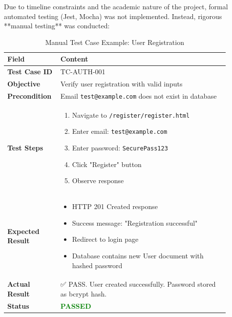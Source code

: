 Due to timeline constraints and the academic nature of the project, formal automated testing (Jest, Mocha) was not implemented. Instead, rigorous **manual testing** was conducted:

\begin{table}[H]
\centering
\caption{Manual Test Case Example: User Registration}
\label{tab:test_register}
\small
\begin{tabular}{@{}p{0.18\linewidth}p{0.72\linewidth}@{}}
\toprule
\textbf{Field} & \textbf{Content} \\
\midrule
\textbf{Test Case ID} & TC-AUTH-001 \\
\textbf{Objective} & Verify user registration with valid inputs \\
\textbf{Precondition} & Email \texttt{test@example.com} does not exist in database \\
\textbf{Test Steps} & 
\begin{minipage}[t]{\linewidth}
\begin{enumerate}[nosep,leftmargin=*]
    \item Navigate to \texttt{/register/register.html}
    \item Enter email: \texttt{test@example.com}
    \item Enter password: \texttt{SecurePass123}
    \item Click "Register" button
    \item Observe response
\end{enumerate}
\end{minipage} \\
\textbf{Expected Result} & 
\begin{minipage}[t]{\linewidth}
\begin{itemize}[nosep,leftmargin=*]
    \item HTTP 201 Created response
    \item Success message: "Registration successful"
    \item Redirect to login page
    \item Database contains new User document with hashed password
\end{itemize}
\end{minipage} \\
\textbf{Actual Result} & ✅ PASS. User created successfully. Password stored as bcrypt hash. \\
\textbf{Status} & \textcolor{green}{\textbf{PASSED}} \\
\bottomrule
\end{tabular}
\end{table}

